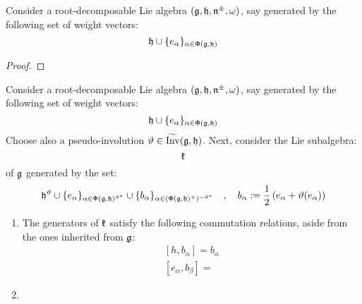         \begin{lemma} \label{lemma: root_decomposable_lie_algebras_commutators}
            Consider a root-decomposable Lie algebra $(\mathfrak{g}, \mathfrak{h}, \mathfrak{n}^{\pm}, \omega)$, say generated by the following set of weight vectors:
                $$\mathfrak{h} \cup \{e_{\alpha}\}_{\alpha \in \mathsf{\Phi}(\mathfrak{g}, \mathfrak{h})}$$
            
        \end{lemma}
            \begin{proof}
                
            \end{proof}
        \begin{proposition} \label{prop: constructing_pseudo_fixed_point_subalgebras}
            Consider a root-decomposable Lie algebra $(\mathfrak{g}, \mathfrak{h}, \mathfrak{n}^{\pm}, \omega)$, say generated by the following set of weight vectors:
                $$\mathfrak{h} \cup \{e_{\alpha}\}_{\alpha \in \mathsf{\Phi}(\mathfrak{g}, \mathfrak{h})}$$
            Choose also a pseudo-involution $\vartheta \in \widetilde{\operatorname{Inv}}(\mathfrak{g}, \mathfrak{h})$. Next, consider the Lie subalgebra:
                $$\mathfrak{k}$$
            of $\mathfrak{g}$ generated by the set:
                \begin{equation} \label{equation: pseudo_fixed_point_subalgebra_generators}
                    \mathfrak{h}^{\vartheta} \cup \{ e_{\alpha} \}_{\alpha \in \mathsf{\Phi}(\mathfrak{g}, \mathfrak{h})^{\vartheta^*}} \cup \{ b_{\alpha} \}_{\alpha \in (\mathsf{\Phi}(\mathfrak{g}, \mathfrak{h})^+)^{-\vartheta^*}} \quad, \quad b_{\alpha} := \frac12\left( e_{\alpha} + \vartheta(e_{\alpha}) \right)
                \end{equation}
                
            \begin{enumerate}
                \item The generators of $\mathfrak{k}$ satisfy the following commutation relations, aside from the ones inherited from $\mathfrak{g}$:
                    \begin{equation} \label{equation: pseudo_fixed_point_subalgebra_relations}
                        \begin{gathered}
                            [h, b_{\alpha}] = b_{\alpha}
                            \\
                            [e_{\alpha}, b_{\beta}] = 
                        \end{gathered}
                    \end{equation}
                \item 
            \end{enumerate}
        \end{proposition}
